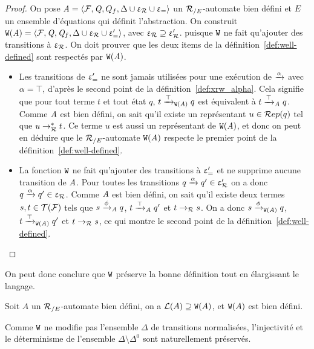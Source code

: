 \begin{proof}
  On pose $\mathit A = \langle \mathcal{F}, \mathit Q, Q_f, \Delta \cup \upvarepsilon_{\mathcal R} \cup \upvarepsilon_{=}\rangle$ un ${\mathcal R_{/E}}$-automate bien défini et
  $E$ un ensemble d'équations qui définit l'abstraction.
  On construit $\mathtt{W}(\mathit A) = \langle \mathcal{F}, \mathit Q, \mathit Q_f, \Delta \cup \upvarepsilon_{\mathcal R} \cup \upvarepsilon_{=}'\rangle$, avec $\upvarepsilon_{\mathcal R} \supseteq \upvarepsilon_{\mathcal R}'$.
  puisque $\mathtt{W}$ ne fait qu'ajouter des transitions à $\upvarepsilon_{\mathcal R}$. On doit prouver que les deux items de la définition~\ref{def:well-defined}
  sont respectés par $\mathtt{W}(\mathit A)$.
  \begin{itemize}
  \item 
    Les transitions de $\upvarepsilon_{=}'$ ne sont jamais utilisées pour une exécution de $\xrightarrow{\alpha}$ avec $\alpha = \top$,
    d'après le second point de la définition~\ref{def:xrw_alpha}.
    Cela signifie que pour tout terme $t$ et tout état $q$, $t \xrightarrow{\top}_{\mathtt{W}(\mathit A)} q$ est équivalent à $t \xrightarrow{\top}_\mathit A q$.
    Comme $\mathit A$ est bien défini, on sait qu'il existe un représentant $u \in \mathcal R ep(q)$ tel que $u \rightarrow^*_\mathcal R t$.
    Ce terme $u$ est aussi un représentant de $\mathtt{W}(\mathit A)$, et donc on peut en déduire que le ${\mathcal R_{/E}}$-automate $\mathtt{W}(\mathit A)$ 
    respecte le premier point de la définition~\ref{def:well-defined}.

  \item
    La fonction $\mathtt{W}$ ne fait qu'ajouter des transitions à $\upvarepsilon_{=}'$ et ne supprime aucune transition de $\mathit A$.
    Pour toutes les transitions $q \xrightarrow{\alpha} q' \in \upvarepsilon_{\mathcal R}'$ on a donc $q \xrightarrow{\alpha} q' \in \upvarepsilon_{\mathcal R}$.
    Comme $\mathit A$ est bien défini, on sait qu'il existe deux termes $s,t\in \mathcal{T(F)}$ tels que
    $s\xrightarrow{\phi}_\mathit A q$, $t\xrightarrow{\top}_\mathit A q'$ et $t \rightarrow_\mathcal R s$.
    On a donc $s\xrightarrow{\phi}_{\mathtt{W}(\mathit A)} q$, $t\xrightarrow{\top}_{\mathtt{W}(\mathit A)} q'$ et $t \rightarrow_\mathcal R s$, ce qui montre le second point
    de la définition~\ref{def:well-defined}.
  \end{itemize}
\end{proof}

On peut donc conclure que $\mathtt{W}$ préserve la bonne définition tout en élargissant le langage.

\begin{property}
  \label{thm:W}
  Soit $A$ un ${\mathcal R_{/E}}$-automate bien défini, on a $\mathcal{L}(A) \supseteq \mathtt{W}(A)$,
  et $\mathtt{W}(A)$ est bien défini.
\end{property}


\begin{remark}
  Comme $\mathtt{W}$ ne modifie pas l'ensemble $\Delta$ de transitions normalisées,   
  l'injectivité et le déterminisme de l'ensemble $\Delta \setminus \Delta^0$ sont naturellement
  préservés. 
\end{remark}

